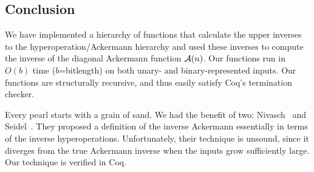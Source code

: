 \subsection{Conclusion}
We have implemented a hierarchy of functions that calculate the upper inverses
to the hyperoperation/Ackermann hierarchy and used these inverses
to compute the inverse of the diagonal Ackermann function $\mathcal{A}(n)$.
Our functions run in $O(b)$ time ($b$=bitlength) on both unary- and 
binary-represented inputs.  Our functions are structurally recursive, 
and thus easily satisfy Coq's termination checker.

Every pearl starts with a grain of sand.  We had the benefit of two:
Nivasch~\cite{nivasch} and Seidel~\cite{seidel}.
They proposed a definition of the inverse Ackermann essentially in terms of
the inverse hyperoperations.  Unfortunately, their technique is unsound, since it diverges from
the true Ackermann inverse when the inputs grow sufficiently large.  Our technique is verified in Coq.








